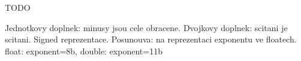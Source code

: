 TODO

Jednotkovy doplnek: minusy jsou cele obracene.
Dvojkovy doplnek: scitani je scitani.
Signed reprezentace.
Posunouva: na reprezentaci exponentu ve floatech.
float: exponent=8b, double: exponent=11b
